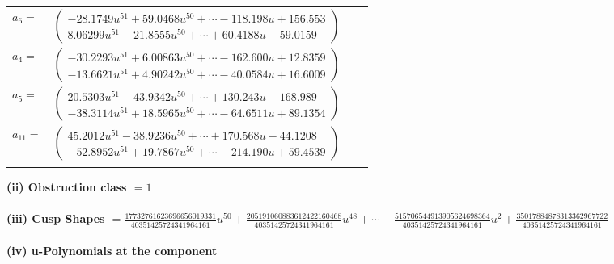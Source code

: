 \documentclass[1p]{elsarticle_modified}
\theoremstyle{definition}
\begin{document}
\begin{tabular}{m{7pt} m{180pt} m{7pt} m{180pt} }
\flushright $a_{6}=$&$\begin{pmatrix}-28.1749 u^{51}+59.0468 u^{50}+\cdots-118.198 u+156.553\\8.06299 u^{51}-21.8555 u^{50}+\cdots+60.4188 u-59.0159\end{pmatrix}$ \\
\flushright $a_{4}=$&$\begin{pmatrix}-30.2293 u^{51}+6.00863 u^{50}+\cdots-162.600 u+12.8359\\-13.6621 u^{51}+4.90242 u^{50}+\cdots-40.0584 u+16.6009\end{pmatrix}$ \\
\flushright $a_{5}=$&$\begin{pmatrix}20.5303 u^{51}-43.9342 u^{50}+\cdots+130.243 u-168.989\\-38.3114 u^{51}+18.5965 u^{50}+\cdots-64.6511 u+89.1354\end{pmatrix}$ \\
\flushright $a_{11}=$&$\begin{pmatrix}45.2012 u^{51}-38.9236 u^{50}+\cdots+170.568 u-44.1208\\-52.8952 u^{51}+19.7867 u^{50}+\cdots-214.190 u+59.4539\end{pmatrix}$\\&\end{tabular}
\flushleft \textbf{(ii) Obstruction class $= 1$}\\~\\
\flushleft \textbf{(iii) Cusp Shapes $= \frac{17732761623696656019331}{40351425724341964161} u^{50}+\frac{205191060883612422160468}{40351425724341964161} u^{48}+\cdots+\frac{515706544913905624698364}{40351425724341964161} u^2+\frac{35017884878313362967722}{40351425724341964161}$}\\~\\
\newpage\renewcommand{\arraystretch}{1}
\flushleft \textbf{(iv) u-Polynomials at the component}\newline \\
\end{document}
